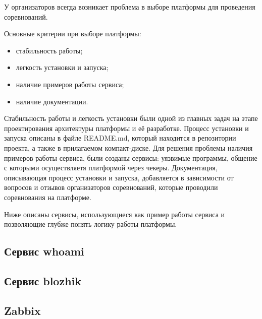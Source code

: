 У организаторов всегда возникает проблема в выборе платформы для проведения соревнований.

Основные критерии при выборе платформы:
\begin{itemize}
\item стабильность работы;
\item легкость установки и запуска;
\item наличие примеров работы сервиса;
\item наличие документации.
\end{itemize}


Стабильность работы и легкость установки были одной из главных задач на этапе проектирования архитектуры платформы и её разработке. Процесс установки и запуска описаны в файле README.md, который находится в репозитории проекта, а также в прилагаемом компакт-диске. 
Для решения проблемы наличия примеров работы сервиса, были созданы сервисы: уязвимые программы, общение с которыми осуществляетя платформой через чекеры.
Документация, описывающая процесс установки и запуска, добавляется в зависимости от вопросов и отзывов организаторов соревнований, которые проводили соревнования на платформе.

Ниже описаны сервисы, использующиеся как пример работы сервиса и позволяющие глубже понять логику работы платформы.

\subsection{Сервис whoami}


\subsection{Сервис blozhik}


\subsection{Zabbix}
